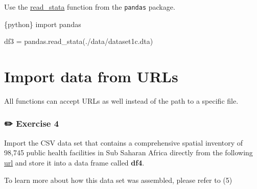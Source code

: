 \documentclass[
  letterpaper,
  DIV=11,
  numbers=noendperiod,
  oneside]{scrreprt}
\newenvironment{Shaded}{\begin{snugshade}}{\end{snugshade}}
\newcommand{\ImportTok}[1]{\textcolor[rgb]{0.00,0.46,0.62}{#1}}
\newcommand{\InformationTok}[1]{\textcolor[rgb]{0.37,0.37,0.37}{#1}}
\newcommand{\NormalTok}[1]{\textcolor[rgb]{0.00,0.23,0.31}{#1}}
\newcommand{\OperatorTok}[1]{\textcolor[rgb]{0.37,0.37,0.37}{#1}}
\newcommand{\StringTok}[1]{\textcolor[rgb]{0.13,0.47,0.30}{#1}}
\begin{document}
Use the
\href{https://pandas.pydata.org/docs/reference/api/pandas.read_stata.html}{read\_stata}
function from the \texttt{pandas} package.

\begin{Shaded}
\begin{Highlighting}[]
\InformationTok{\textasciigrave{}\textasciigrave{}\textasciigrave{}\{python\}}
\ImportTok{import}\NormalTok{ pandas}

\NormalTok{df3 }\OperatorTok{=}\NormalTok{ pandas.read\_stata(}\StringTok{\textquotesingle{}./data/dataset1c.dta\textquotesingle{}}\NormalTok{)}
\InformationTok{\textasciigrave{}\textasciigrave{}\textasciigrave{}}
\end{Highlighting}
\end{Shaded}

\hypertarget{import-data-from-urls}{%
\section{Import data from URLs}\label{import-data-from-urls}}

All functions can accept URLs as well instead of the path to a specific
file.

\hypertarget{exercise-4}{%
\subsubsection{\texorpdfstring{{✏️} Exercise
4}{✏️ Exercise 4}}\label{exercise-4}}

Import the CSV data set that contains a comprehensive spatial inventory
of 98,745 public health facilities in Sub Saharan Africa directly from
the following
\href{https://open.africa/dataset/d7335980-29d5-476c-bf7a-feb4e22cf631/resource/e2432e8a-cf15-4a8b-b8c3-567f443c1459/download/cfa-data-hospitals-in-africa-00-ssa-mfl-130219.xlsx-ssa-mfl.csv}{url}
and store it into a data frame called \textbf{df4}.

To learn more about how this data set was assembled, please refer to (5)
\end{document}
